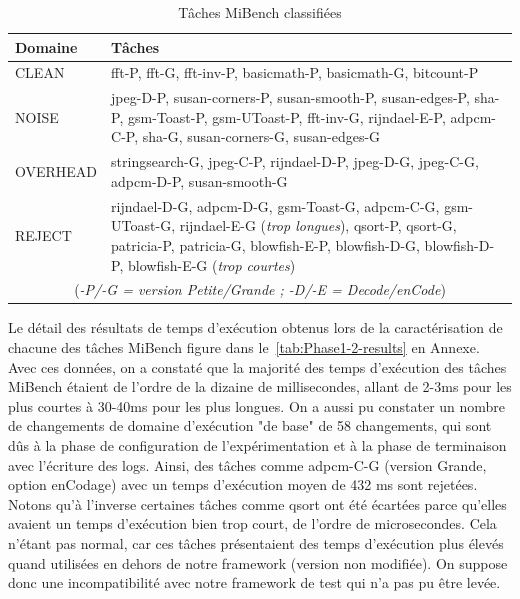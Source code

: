\documentclass[french, a4paper, 11pt, twoside, pdftex]{StyleThese}
\begin{document}
\begin{table}[ht]
	\caption{Tâches MiBench classifiées}
	\label{tab:MiBench_classify}
	\centering
	\begin{tabularx}{\textwidth}{lX} %
		\toprule
		Domaine		& Tâches					\\
		\midrule
		CLEAN  		& fft-P, fft-G, fft-inv-P, basicmath-P, basicmath-G, bitcount-P						\\
		NOISE     	& jpeg-D-P, susan-corners-P, susan-smooth-P, susan-edges-P, sha-P, gsm-Toast-P, gsm-UToast-P, fft-inv-G, rijndael-E-P, adpcm-C-P, sha-G, susan-corners-G, susan-edges-G 		   					\\
		OVERHEAD    & stringsearch-G, jpeg-C-P, rijndael-D-P, jpeg-D-G, jpeg-C-G, adpcm-D-P, susan-smooth-G	   	\\
		REJECT      & rijndael-D-G, adpcm-D-G, gsm-Toast-G, adpcm-C-G, gsm-UToast-G, rijndael-E-G (\textit{trop longues}), qsort-P, qsort-G, patricia-P, patricia-G, blowfish-E-P, blowfish-D-G, blowfish-D-P, blowfish-E-G (\textit{trop courtes})				\\
		\bottomrule
		\multicolumn{2}{c}{(\textit{-P/-G = version Petite/Grande ; -D/-E = Decode/enCode}) }
	\end{tabularx}
\end{table}

 Le détail des résultats de temps d’exécution obtenus lors de la caractérisation de chacune des tâches MiBench figure dans le~\autoref{tab:Phase1-2-results} en Annexe. Avec ces données, on a constaté que la majorité des temps d'exécution des tâches MiBench étaient de l'ordre de la dizaine de millisecondes, allant de 2-3ms pour les plus courtes à 30-40ms pour les plus longues. On a aussi pu constater un nombre de changements de domaine d'exécution "de base" de 58 changements, qui sont dûs à la phase de configuration de l'expérimentation et à la phase de terminaison avec l'écriture des logs. Ainsi, des tâches comme adpcm-C-G (version Grande, option enCodage) avec un temps d'exécution moyen de 432 ms sont rejetées. Notons qu'à l'inverse certaines tâches comme qsort ont été écartées parce qu'elles avaient un temps d'exécution bien trop court, de l'ordre de microsecondes. Cela n'étant pas normal, car ces tâches présentaient des temps d'exécution plus élevés quand utilisées en dehors de notre framework (version non modifiée). On suppose donc une incompatibilité avec notre framework de test qui n'a pas pu être levée.
\end{document}
